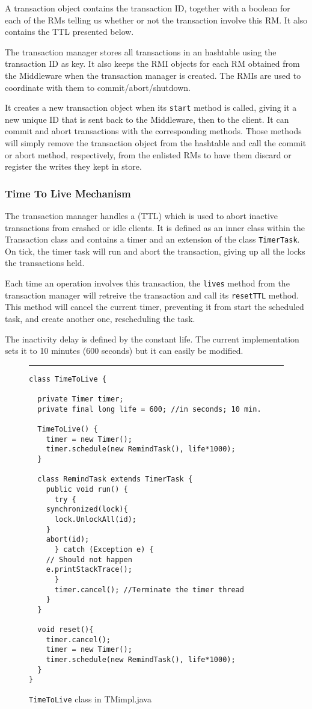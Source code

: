 \documentclass[12pt]{article}
\theoremstyle{plain}%
\theoremstyle{definition}
\theoremstyle{remark}
\newcommand{\java}[1]{{\lstinline!#1!}}
\newenvironment{figureone}[1]{%
  \def\deffigurecaption{#1}%
  \begin{figure}[htbp]%
  \begin{center}%
  \begin{minipage}{\columnwidth}%
  \hrule \vspace*{2ex}%
}{%
  \end{minipage}%
  \end{center}%
  \caption{\deffigurecaption}%
  \end{figure}%
}
\begin{document}
A transaction object contains the transaction ID, together with a boolean for each of the RMs telling us whether or not the transaction involve this RM. It also contains the TTL presented below.

The transaction manager stores all transactions in an hashtable using the transaction ID as key. It also keeps the RMI objects for each RM obtained from the Middleware when the transaction manager is created. The RMIs are used to coordinate with them to commit/abort/shutdown.

It creates a new transaction object when its \java{start} method is called, giving it a new unique ID that is sent back to the Middleware, then to the client. It can commit and abort transactions with the corresponding methods. Those methods will simply remove the transaction object from the hashtable and call the commit or abort method, respectively, from the enlisted RMs to have them discard or register the writes they kept in store.

\subsubsection*{Time To Live Mechanism}

The transaction manager handles a (TTL) which is used to abort inactive transactions from crashed or idle clients. It is defined as an inner class within the Transaction class and contains a timer and an extension of the class \java{TimerTask}. On tick, the timer task will run and abort the transaction, giving up all the locks the transactions held. 

Each time an operation involves this transaction, the \java{lives} method from the transaction manager will retreive the transaction and call its \java{resetTTL} method. This method will cancel the current timer, preventing it from start the scheduled task, and create another one, rescheduling the task.

The inactivity delay is defined by the constant life. The current implementation sets it to 10 minutes (600 seconds) but it can easily be modified.

\begin{figureone}{\java{TimeToLive} class in TMimpl.java \label{fig:ttl}}
\begin{lstlisting}
class TimeToLive {

  private Timer timer;
  private final long life = 600; //in seconds; 10 min.
  
  TimeToLive() {
    timer = new Timer();
    timer.schedule(new RemindTask(), life*1000);
  }
  
  class RemindTask extends TimerTask {
    public void run() {
      try {
	synchronized(lock){
	  lock.UnlockAll(id);
	}
	abort(id);
      } catch (Exception e) {
	// Should not happen
	e.printStackTrace();
      }
      timer.cancel(); //Terminate the timer thread
    }
  }	
  
  void reset(){
    timer.cancel();
    timer = new Timer();
    timer.schedule(new RemindTask(), life*1000);
  }
}
\end{lstlisting}
\end{figureone}
\end{document}
